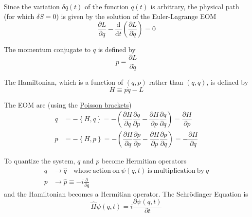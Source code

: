 \documentclass{article}
\begin{document}
\noindent Since the variation $ \delta q (t) $ of the function $q(t)$ is arbitrary, the physical path (for which $\delta S = 0$) is given by the solution of the Euler-Lagrange EOM
\begin{equation*}
    \dfrac{ \partial L }{ \partial q } - \dfrac{\mathrm{d}}{ \mathrm{d} t } \left( \dfrac{ \partial L }{ \partial \dot{q} } \right) = 0
\end{equation*}

\noindent The momentum conjugate to $q$ is defined by
\begin{equation*}
    p \equiv \dfrac{ \partial L }{ \partial \dot{q} }
\end{equation*}

\noindent The Hamiltonian, which is a function of $(q, p)$ rather than $(q, \dot{q})$, is defined by
\begin{equation*}
    H \equiv p \dot{q} - L
\end{equation*}

\noindent The EOM are (using the \underline{Poisson brackets})
\begin{align*}
    \dot{q} &= - \left\lbrace H, q \right\rbrace = - \left( \dfrac{ \partial H }{ \partial q } \dfrac{ \partial q }{ \partial p } - \dfrac{ \partial H }{ \partial p } \dfrac{ \partial q }{ \partial q } \right) = \dfrac{ \partial H }{ \partial p } \\
    \dot{p} &= - \left\lbrace H, p \right\rbrace = - \left( \dfrac{ \partial H }{ \partial q } \dfrac{ \partial p }{ \partial p } - \dfrac{ \partial H }{ \partial p } \dfrac{ \partial p }{ \partial q } \right) = - \dfrac{ \partial H }{ \partial q }
\end{align*}

\noindent To quantize the system, $q$ and $p$ become Hermitian operators
\begin{align*}
    q &\longrightarrow \hat{q} \quad \mathrm{whose} ~ \mathrm{action} ~ \mathrm{on} ~ \psi (q, t) ~ \mathrm{is} ~ \mathrm{multiplication} ~ \mathrm{by} ~ q \\
    p &\longrightarrow \hat{p} \equiv -i \frac{\partial}{ \partial q }
\end{align*}
and the Hamiltonian becomes a Hermitian operator. The Schr\"{o}dinger Equation is
\begin{equation*}
    \hat{H} \psi (q, t) = i \dfrac{ \partial \psi (q, t) }{ \partial t }
\end{equation*}
\end{document}
